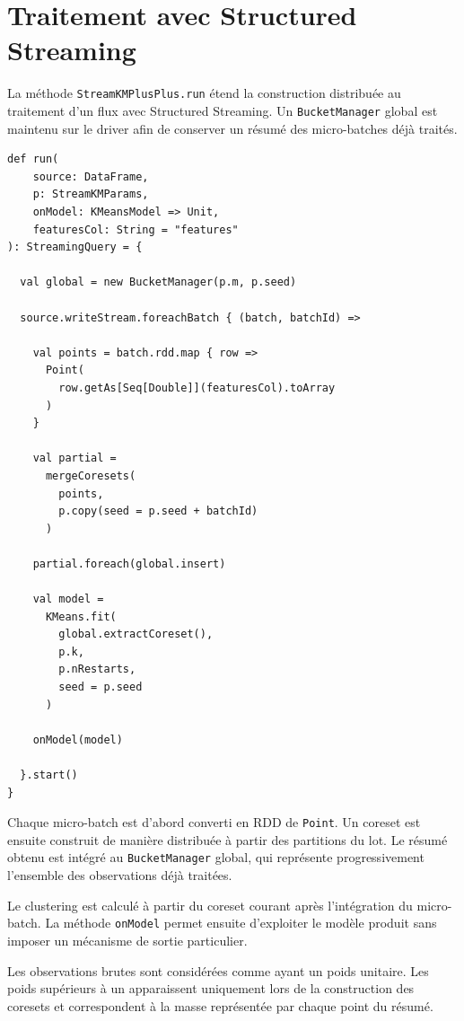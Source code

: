 \section{Traitement avec Structured Streaming}

La méthode \texttt{StreamKMPlusPlus.run} étend la construction distribuée au traitement d'un flux avec Structured Streaming. Un \texttt{BucketManager} global est maintenu sur le driver afin de conserver un résumé des micro-batches déjà traités.

\begin{verbatim}
def run(
    source: DataFrame,
    p: StreamKMParams,
    onModel: KMeansModel => Unit,
    featuresCol: String = "features"
): StreamingQuery = {

  val global = new BucketManager(p.m, p.seed)

  source.writeStream.foreachBatch { (batch, batchId) =>

    val points = batch.rdd.map { row =>
      Point(
        row.getAs[Seq[Double]](featuresCol).toArray
      )
    }

    val partial =
      mergeCoresets(
        points,
        p.copy(seed = p.seed + batchId)
      )

    partial.foreach(global.insert)

    val model =
      KMeans.fit(
        global.extractCoreset(),
        p.k,
        p.nRestarts,
        seed = p.seed
      )

    onModel(model)

  }.start()
}
\end{verbatim}

Chaque micro-batch est d'abord converti en RDD de \texttt{Point}. Un coreset est ensuite construit de manière distribuée à partir des partitions du lot. Le résumé obtenu est intégré au \texttt{BucketManager} global, qui représente progressivement l'ensemble des observations déjà traitées.

Le clustering est calculé à partir du coreset courant après l'intégration du micro-batch. La méthode \texttt{onModel} permet ensuite d'exploiter le modèle produit sans imposer un mécanisme de sortie particulier.

Les observations brutes sont considérées comme ayant un poids unitaire. Les poids supérieurs à un apparaissent uniquement lors de la construction des coresets et correspondent à la masse représentée par chaque point du résumé.

